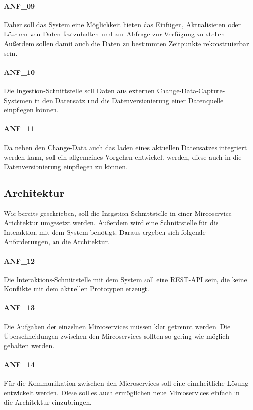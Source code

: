 \paragraph{ANF\_09}
\label{ANF_09}
Daher soll das System eine Möglichkeit bieten das Einfügen, Aktualisieren oder Löschen von Daten festzuhalten und zur Abfrage zur Verfügung zu stellen.
Außerdem sollen damit auch die Daten zu bestimmten Zeitpunkte rekonstruierbar sein.

\paragraph{ANF\_10}
\label{ANF_10}
Die Ingestion-Schnittstelle soll Daten aus externen Change-Data-Capture-Systemen in den Datensatz und die Datenversionierung einer Datenquelle einpflegen können.

\paragraph{ANF\_11}
\label{ANF_11}
Da neben den Change-Data auch das laden eines aktuellen Datensatzes integriert werden kann, soll ein allgemeines Vorgehen entwickelt werden, diese auch in die Datenversionierung einpflegen zu können.

\subsection{Architektur}
Wie bereits geschrieben, soll die Inegstion-Schnittstelle in einer Mircoservice-Arichtektur umgesetzt werden.
Außerdem wird eine Schnittstelle für die Interaktion mit dem System benötigt.
Daraus ergeben sich folgende Anforderungen, an die Architektur.

\paragraph{ANF\_12}
\label{ANF_12}
Die Interaktions-Schnittstelle mit dem System soll eine REST-API sein, die keine Konflikte mit dem aktuellen Prototypen erzeugt.

\paragraph{ANF\_13}
\label{ANF_13}
Die Aufgaben der einzelnen Mircoservices müssen klar getrennt werden.
Die Überschneidungen zwischen den Mircoservices sollten so gering wie möglich gehalten werden.

\paragraph{ANF\_14}
\label{ANF_14}
Für die Kommunikation zwischen den Microservices soll eine einnheitliche Lösung entwickelt werden.
Diese soll es auch ermöglichen neue Mircoservices einfach in die Architektur einzubringen.

